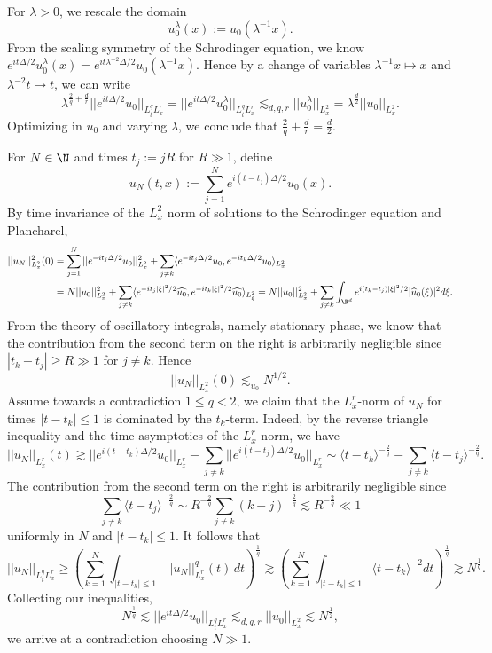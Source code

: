 \begin{solution}
	For $\lambda > 0$, we rescale the domain
		\[ u_0^\lambda (x) := u_0 (\lambda^{-1} x). \]
	From the scaling symmetry of the Schrodinger equation, we know $e^{it\Delta/2} u_0^\lambda (x) = e^{it\lambda^{-2} \Delta/2}	 u_0 (\lambda^{-1} x)$. Hence by a change of variables $\lambda^{-1} x \mapsto x$ and $\lambda^{-2} t \mapsto t$, we can write
		\[ \lambda^{\frac2q + \frac{d}{r}}  || e^{it \Delta/2} u_0 ||_{L^q_t L^r_x}= || e^{it \Delta/2} u_0^\lambda ||_{L^q_t L^r_x} \lesssim_{d, q, r} ||u_0^\lambda||_{L^2_x} = \lambda^{\frac{d}{2}}|| u_0||_{L^2_x}. \]	
	Optimizing in $u_0$ and varying $\lambda$, we conclude that $\frac2q + \frac{d}{r} = \frac{d}{2}$. 
	
	For $N \in \N$ and times $t_j := jR$ for $R \gg 1$, define
		\[ u_N (t, x) := \sum_{j = 1}^N e^{i(t - t_j) \Delta/2} u_0 (x). \]
	By time invariance of the $L^2_x$ norm of solutions to the Schrodinger equation and Plancharel, 
		\begin{align*}
			 ||u_N||^2_{L^2_x} (0) 
			 	&= \sum_{j = 1}^N ||e^{-i t_j \Delta/2} u_0||_{L^2_x}^2 + \sum_{j \neq k} \langle e^{-i t_j \Delta/2} u_0, e^{-it_k \Delta/2} u_0 \rangle_{L^2_x} \\
			 	&= N ||u_0||_{L^2_x}^2 + \sum_{j \neq k} \langle e^{-i t_j |\xi|^2/2} \widehat{u_0}, e^{-it_k |\xi|^2/2} \widehat{u_0} \rangle_{L^2_\xi}= N ||u_0||_{L^2_x}^2 + \sum_{j \neq k} \int_{\R^d} e^{i (t_k - t_j) |\xi|^2 /2} |\widehat u_0 (\xi)|^2 d \xi.
		\end{align*}	 		
	From the theory of oscillatory integrals, namely stationary phase, we know that the contribution from the second term on the right is arbitrarily negligible since $|t_k - t_j|  \geq R \gg 1$ for $j \neq k$. Hence
		\[ ||u_N||_{L^2_x} (0) \lesssim_{u_0} N^{1/2}. \]
	Assume towards a contradiction $1 \leq q < 2$, we claim that the $L^r_x$-norm of $u_N$ for times $|t - t_k| \leq 1$ is dominated by the $t_k$-term. Indeed, by the reverse triangle inequality and the time asymptotics of the $L^r_x$-norm, we have
		\[  ||u_N||_{L^r_x} (t) \gtrsim  || e^{i(t - t_k) \Delta/2} u_0 ||_{L^r_x} - \sum_{j \neq k} ||e^{i (t - t_j) \Delta/2} u_0 ||_{L^r_x}  \sim  \langle t - t_k \rangle^{-\frac2q} - \sum_{j \neq k} \langle t - t_j \rangle^{-\frac2q} . \]
	The contribution from the second term on the right is arbitrarily negligible since
		\[ \sum_{j \neq k} \langle t - t_j \rangle^{-\frac2q} \sim R^{-\frac2q} \sum_{j \neq k} (k - j)^{-\frac2q} \lesssim R^{-\frac2q} \ll 1\]
	uniformly in $N$ and $|t - t_k| \leq 1$. It follows that 
		\[ ||u_N||_{L^q_t L^r_x} \geq \left( \sum_{k= 1}^N \int_{|t - t_k| \leq 1} ||u_N ||_{L^r_x}^q (t)  \, dt \right)^\frac1q \gtrsim \left( \sum_{k = 1}^N \int_{|t - t_k| \leq 1} \langle t - t_k \rangle^{-2} dt \right)^{\frac1q} \gtrsim N^{\frac1q} .\]
	Collecting our inequalities,  
		\[ N^{\frac1q} \lesssim ||e^{it \Delta/ 2} u_0 ||_{L^q_t L^r_x} \lesssim_{d, q, r} ||u_0||_{L^2_x} \lesssim N^{\frac12}, \]
	we arrive at a contradiction choosing $N \gg 1$.
\end{solution}

